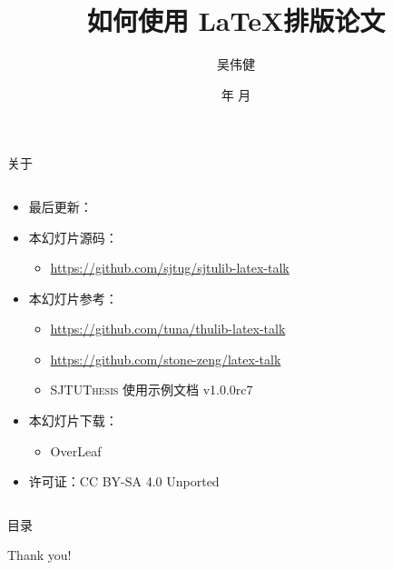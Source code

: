 \documentclass[xcolor=table,dvipsnames,svgnames,aspectratio=169,fontset=ubuntu]{ctexbeamer}
\title{如何使用 \LaTeX 排版论文}
\author{吴伟健}
\institute{上海交通大学 Linux 用户组}
\date{\the\year 年 \the\month 月}
\newcommand{\SJTUThesis}{\textsc{SJTUThesis}\xspace}
\newcommand{\SJTUThesisVersion}{1.0.0rc7}
\newcommand\link[1]{\href{#1}{\faLink}}
\begin{document}
\begin{frame}
  \titlepage
\end{frame}


\begin{frame}{关于}
  \begin{columns}[c]
    \begin{column}{.7\textwidth}
      \begin{itemize}
        \item 最后更新：\texttt{\DTMnow}
        \item 本幻灯片源码：
          \begin{itemize}
            \item \url{https://github.com/sjtug/sjtulib-latex-talk}
          \end{itemize}
        \item 本幻灯片参考：
          \begin{itemize}
            \item \url{https://github.com/tuna/thulib-latex-talk}
            \item \url{https://github.com/stone-zeng/latex-talk}
            \item \SJTUThesis{} 使用示例文档 v\SJTUThesisVersion
          \end{itemize}
        \item 本幻灯片下载：
          \begin{itemize}
            \item OverLeaf \link{https://www.overleaf.com/read/fvwxzvcxhcwd}
          \end{itemize}
        \item 许可证：CC BY-SA 4.0 Unported \ccbysa
      \end{itemize}
    \end{column}
    \begin{column}{.3\textwidth}
    \end{column}
  \end{columns}
\end{frame}


\begin{frame}{目录}
  \tableofcontents
\end{frame}







\begin{frame}
  \begin{center}
    {
     \Huge\selectfont Thank you!}
  \end{center}
\end{frame}
\end{document}

